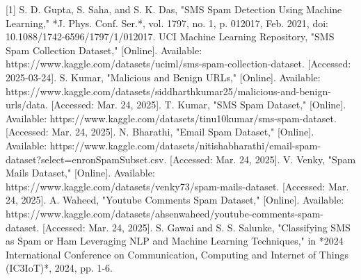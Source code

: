 \documentclass{article}
\begin{document}
[1] S. D. Gupta, S. Saha, and S. K. Das, "SMS Spam Detection Using Machine Learning," *J. Phys. Conf. Ser.*, vol. 1797, no. 1, p. 012017, Feb. 2021, doi: 10.1088/1742-6596/1797/1/012017.
\newline
\newline
[2] UCI Machine Learning Repository, "SMS Spam Collection Dataset," [Online]. Available: https://www.kaggle.com/datasets/uciml/sms-spam-collection-dataset. [Accessed: 2025-03-24].
\newline
\newline
[3] S. Kumar, "Malicious and Benign URLs," [Online]. Available: https://www.kaggle.com/datasets/siddharthkumar25/malicious-and-benign-urls/data. [Accessed: Mar. 24, 2025].
\newline
\newline
[4] T. Kumar, "SMS Spam Dataset," [Online]. Available: https://www.kaggle.com/datasets/tinu10kumar/sms-spam-dataset. [Accessed: Mar. 24, 2025].
\newline
\newline
[5] N. Bharathi, "Email Spam Dataset," [Online]. Available: https://www.kaggle.com/datasets/nitishabharathi/email-spam-dataset?select=enronSpamSubset.csv. [Accessed: Mar. 24, 2025].
\newline
\newline
[6] V. Venky, "Spam Mails Dataset," [Online]. Available: https://www.kaggle.com/datasets/venky73/spam-mails-dataset. [Accessed: Mar. 24, 2025].
\newline
\newline
[7] A. Waheed, "Youtube Comments Spam Dataset," [Online]. Available: https://www.kaggle.com/datasets/ahsenwaheed/youtube-comments-spam-dataset. [Accessed: Mar. 24, 2025].
\newline
\newline
[8] S. Gawai and S. S. Salunke, "Classifying SMS as Spam or Ham Leveraging NLP and Machine Learning Techniques," in *2024 International Conference on Communication, Computing and Internet of Things (IC3IoT)*, 2024, pp. 1-6.

\newpage
\end{document}
